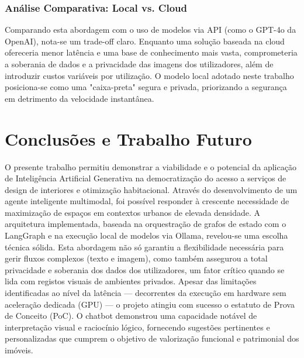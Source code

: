 \documentclass[a4paper,12pt]{scrreprt}
\begin{document}
        \subsection{Análise Comparativa: Local vs. Cloud}
        Comparando esta abordagem com o uso de modelos via API (como o GPT-4o da OpenAI), nota-se um trade-off claro. Enquanto uma solução baseada na cloud ofereceria menor latência e uma base de conhecimento mais vasta, comprometeria a soberania de dados e a privacidade das imagens dos utilizadores, além de introduzir custos variáveis por utilização. O modelo local adotado neste trabalho posiciona-se como uma "caixa-preta" segura e privada, priorizando a segurança em detrimento da velocidade instantânea.



\chapter{Conclusões e Trabalho Futuro}
    O presente trabalho permitiu demonstrar a viabilidade e o potencial da aplicação de Inteligência Artificial Generativa na democratização do acesso a serviços de design de interiores e otimização habitacional. Através do desenvolvimento de um agente inteligente multimodal, foi possível responder à crescente necessidade de maximização de espaços em contextos urbanos de elevada densidade.
    A arquitetura implementada, baseada na orquestração de grafos de estado com o LangGraph e na execução local de modelos via Ollama, revelou-se uma escolha técnica sólida. Esta abordagem não só garantiu a flexibilidade necessária para gerir fluxos complexos (texto e imagem), como também assegurou a total privacidade e soberania dos dados dos utilizadores, um fator crítico quando se lida com registos visuais de ambientes privados.
    Apesar das limitações identificadas ao nível da latência — decorrentes da execução em hardware sem aceleração dedicada (GPU) — o projeto atingiu com sucesso o estatuto de Prova de Conceito (PoC). O chatbot demonstrou uma capacidade notável de interpretação visual e raciocínio lógico, fornecendo sugestões pertinentes e personalizadas que cumprem o objetivo de valorização funcional e patrimonial dos imóveis.
    
\end{document}
